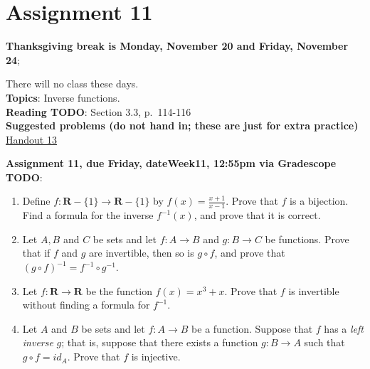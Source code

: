 \documentclass[12pt]{article}
\newcommand{\HWdueTime}{12:55pm }
\begin{document}
 
\newpage
\section[11 (due \csname dateWeek11\endcsname): Inverse functions.]{Assignment 11}

\noindent \textbf{Thanksgiving break is Monday, November 20 and Friday, November 24};

\noindent There will no class these days.
\\

\noindent \textbf{Topics}: Inverse functions.
\\

\noindent \textbf{Reading TODO}: Section 3.3, p.~114-116
\\

\noindent \textbf{Suggested problems (do not hand in; these are just for extra practice)} \href{https://www.math.emory.edu/~dzb/teaching/250Fall2021/handouts/250-H13-inverses.pdf}{Handout 13}


\noindent \textbf{Assignment 11, due Friday, \csname dateWeek11\endcsname, \HWdueTime via Gradescope TODO}:
\begin{enumerate}
\item Define $f \colon \mathbf{R}-\{1\} \to \mathbf{R} - \{1\}$ by $f(x) = \frac{x+1}{x-1}$. Prove that $f$ is a bijection. Find a formula for the inverse $f^{-1}(x)$, and prove that it is correct.
\item Let $A, B$ and $C$ be sets and let $f \colon A \to B$ and $g \colon B \to C$ be functions. Prove that if $f$ and $g$ are invertible, then so is $g \circ f$, and prove that $(g \circ f)^{-1} = f^{-1} \circ g^{-1}$.
\item Let $f \colon \mathbf{R} \to \mathbf{R}$ be the function $f(x) = x^3 + x$. Prove that $f$ is invertible without finding a formula for $f^{-1}$.
\item Let $A$ and $B$ be sets and let $f \colon A \to B$ be a function. Suppose that $f$ has a \emph{left inverse} $g$; that is, suppose that there exists a function $g \colon B \to A$ such that $g \circ f = id_A$. Prove that $f$ is injective.
\end{enumerate}

\newpage
\end{document}
